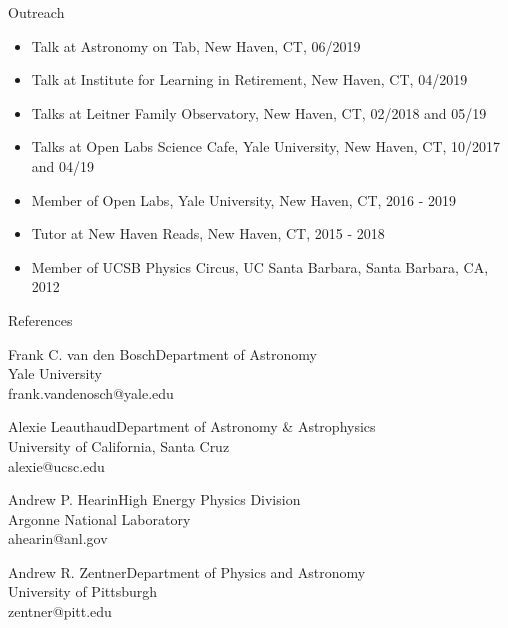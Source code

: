 \documentclass{resume}
\begin{document}
\begin{rSection}{Outreach}
  \begin{itemize}[leftmargin=1.0cm, topsep=0pt, itemsep=0pt, partopsep=0pt, parsep=0pt]
    \item Talk at Astronomy on Tab, New Haven, CT, 06/2019
    \item Talk at Institute for Learning in Retirement, New Haven, CT, 04/2019
    \item Talks at Leitner Family Observatory, New Haven, CT, 02/2018 and 05/19
    \item Talks at Open Labs Science Cafe, Yale University, New Haven, CT, 10/2017 and 04/19
    \item Member of Open Labs, Yale University, New Haven, CT, 2016 - 2019
    \item Tutor at New Haven Reads, New Haven, CT, 2015 - 2018
    \item Member of UCSB Physics Circus, UC Santa Barbara, Santa Barbara, CA, 2012
  \end{itemize}
\end{rSection}

\begin{rSection}{References}
  \begin{adjustwidth}{0.5cm}{}

    \begin{rSubsection}{Frank C. van den Bosch}{}{Department of Astronomy\\Yale University\\frank.vandenosch@yale.edu}{}\end{rSubsection}
    
    \begin{rSubsection}{Alexie Leauthaud}{}{Department of Astronomy \& Astrophysics\\University of California, Santa Cruz\\alexie@ucsc.edu}{}\end{rSubsection}
    
    \begin{rSubsection}{Andrew P. Hearin}{}{High Energy Physics Division\\Argonne National Laboratory\\ahearin@anl.gov}{}\end{rSubsection}
    
    \begin{rSubsection}{Andrew R. Zentner}{}{Department of Physics and Astronomy\\University of Pittsburgh\\zentner@pitt.edu}{}\end{rSubsection}

  \end{adjustwidth}
\end{rSection}
\end{document}

